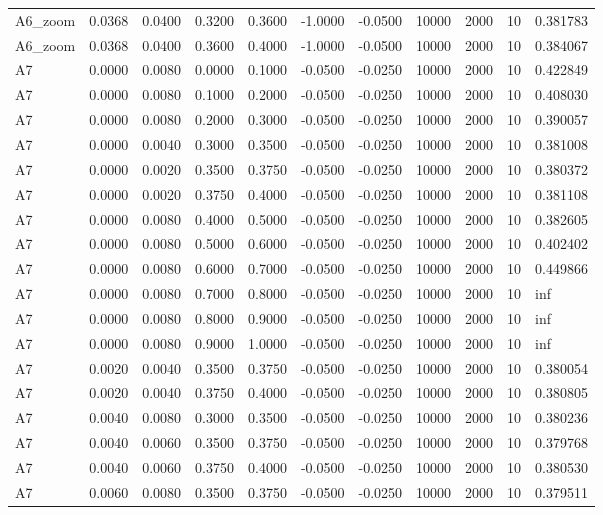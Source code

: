 \documentclass{article}
\begin{document}
\begin{longtable}{l r r r r r r r r r l}
A6_zoom & 0.0368 & 0.0400 & 0.3200 & 0.3600 & -1.0000 & -0.0500 & 10000 & 2000 & 10 & 0.381783 \\
A6_zoom & 0.0368 & 0.0400 & 0.3600 & 0.4000 & -1.0000 & -0.0500 & 10000 & 2000 & 10 & 0.384067 \\
A7 & 0.0000 & 0.0080 & 0.0000 & 0.1000 & -0.0500 & -0.0250 & 10000 & 2000 & 10 & 0.422849 \\
A7 & 0.0000 & 0.0080 & 0.1000 & 0.2000 & -0.0500 & -0.0250 & 10000 & 2000 & 10 & 0.408030 \\
A7 & 0.0000 & 0.0080 & 0.2000 & 0.3000 & -0.0500 & -0.0250 & 10000 & 2000 & 10 & 0.390057 \\
A7 & 0.0000 & 0.0040 & 0.3000 & 0.3500 & -0.0500 & -0.0250 & 10000 & 2000 & 10 & 0.381008 \\
A7 & 0.0000 & 0.0020 & 0.3500 & 0.3750 & -0.0500 & -0.0250 & 10000 & 2000 & 10 & 0.380372 \\
A7 & 0.0000 & 0.0020 & 0.3750 & 0.4000 & -0.0500 & -0.0250 & 10000 & 2000 & 10 & 0.381108 \\
A7 & 0.0000 & 0.0080 & 0.4000 & 0.5000 & -0.0500 & -0.0250 & 10000 & 2000 & 10 & 0.382605 \\
A7 & 0.0000 & 0.0080 & 0.5000 & 0.6000 & -0.0500 & -0.0250 & 10000 & 2000 & 10 & 0.402402 \\
A7 & 0.0000 & 0.0080 & 0.6000 & 0.7000 & -0.0500 & -0.0250 & 10000 & 2000 & 10 & 0.449866 \\
A7 & 0.0000 & 0.0080 & 0.7000 & 0.8000 & -0.0500 & -0.0250 & 10000 & 2000 & 10 & inf \\
A7 & 0.0000 & 0.0080 & 0.8000 & 0.9000 & -0.0500 & -0.0250 & 10000 & 2000 & 10 & inf \\
A7 & 0.0000 & 0.0080 & 0.9000 & 1.0000 & -0.0500 & -0.0250 & 10000 & 2000 & 10 & inf \\
A7 & 0.0020 & 0.0040 & 0.3500 & 0.3750 & -0.0500 & -0.0250 & 10000 & 2000 & 10 & 0.380054 \\
A7 & 0.0020 & 0.0040 & 0.3750 & 0.4000 & -0.0500 & -0.0250 & 10000 & 2000 & 10 & 0.380805 \\
A7 & 0.0040 & 0.0080 & 0.3000 & 0.3500 & -0.0500 & -0.0250 & 10000 & 2000 & 10 & 0.380236 \\
A7 & 0.0040 & 0.0060 & 0.3500 & 0.3750 & -0.0500 & -0.0250 & 10000 & 2000 & 10 & 0.379768 \\
A7 & 0.0040 & 0.0060 & 0.3750 & 0.4000 & -0.0500 & -0.0250 & 10000 & 2000 & 10 & 0.380530 \\
A7 & 0.0060 & 0.0080 & 0.3500 & 0.3750 & -0.0500 & -0.0250 & 10000 & 2000 & 10 & 0.379511 \\

\end{longtable}
\end{document}
